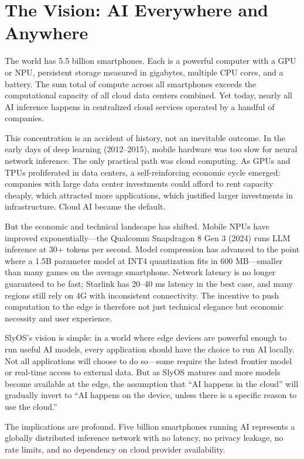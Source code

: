 \documentclass[12pt, letterpaper, twoside]{report}
\begin{document}
\section{The Vision: AI Everywhere and Anywhere}
\label{sec:ai_everywhere}

The world has 5.5 billion smartphones. Each is a powerful computer with a GPU or NPU, persistent storage measured in gigabytes, multiple CPU cores, and a battery. The sum total of compute across all smartphones exceeds the computational capacity of all cloud data centers combined. Yet today, nearly all AI inference happens in centralized cloud services operated by a handful of companies.

This concentration is an accident of history, not an inevitable outcome. In the early days of deep learning (2012--2015), mobile hardware was too slow for neural network inference. The only practical path was cloud computing. As GPUs and TPUs proliferated in data centers, a self-reinforcing economic cycle emerged: companies with large data center investments could afford to rent capacity cheaply, which attracted more applications, which justified larger investments in infrastructure. Cloud AI became the default.

But the economic and technical landscape has shifted. Mobile NPUs have improved exponentially---the Qualcomm Snapdragon 8 Gen 3 (2024) runs LLM inference at 30+ tokens per second. Model compression has advanced to the point where a 1.5B parameter model at INT4 quantization fits in 600 MB---smaller than many games on the average smartphone. Network latency is no longer guaranteed to be fast; Starlink has 20--40 ms latency in the best case, and many regions still rely on 4G with inconsistent connectivity. The incentive to push computation to the edge is therefore not just technical elegance but economic necessity and user experience.

SlyOS's vision is simple: in a world where edge devices are powerful enough to run useful AI models, every application should have the choice to run AI locally. Not all applications will choose to do so---some require the latest frontier model or real-time access to external data. But as SlyOS matures and more models become available at the edge, the assumption that ``AI happens in the cloud'' will gradually invert to ``AI happens on the device, unless there is a specific reason to use the cloud.''

The implications are profound. Five billion smartphones running AI represents a globally distributed inference network with no latency, no privacy leakage, no rate limits, and no dependency on cloud provider availability.
\end{document}
